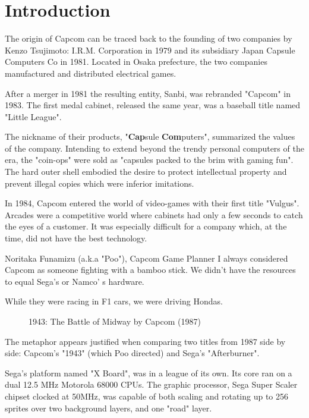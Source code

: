 \chapter{Introduction} 

The origin of Capcom can be traced back to the founding of two companies by Kenzo Tsujimoto: I.R.M. Corporation in 1979 and its subsidiary Japan Capsule Computers Co in 1981. Located in Osaka prefecture, the two companies manufactured and distributed electrical games.

After a merger in 1981 the resulting entity, Sanbi, was rebranded "Capcom" in 1983. The first medal cabinet, released the same year, was a baseball title named "Little League".

The nickname of their products, "\textbf{Cap}sule \textbf{Com}puters", summarized the values of the company. Intending to extend beyond the trendy personal computers of the era, the "coin-ops" were sold as "capsules packed to the brim with gaming fun". The hard outer shell embodied the desire to protect intellectual property and prevent illegal copies which were inferior imitations.


 In 1984, Capcom entered the world of video-games with their first title "Vulgus".
Arcades were a competitive world where cabinets had only a few seconds to catch the eyes of a customer. It was especially difficult for a company which, at the time, did not have the best technology.

\begin{q}{Noritaka Funamizu (a.k.a "Poo"), Capcom Game Planner\cite{planner}}
I always considered Capcom as someone fighting with a bamboo stick. We didn't have the resources to equal Sega's or Namco'
s hardware. 

While they were racing in F1 cars, we were driving Hondas.
\end{q}


\begin{figure}[H]
\caption*{1943: The Battle of Midway by Capcom (1987)}
\end{figure}

The metaphor appears justified when comparing two titles from 1987 side by side: Capcom's "1943" (which Poo directed) and Sega's "Afterburner".

Sega's platform named "X Board", was in a league of its own. Its core ran on a dual 12.5 MHz Motorola 68000 CPUs. The graphic processor, Sega Super Scaler chipset clocked at 50MHz, was capable of both scaling and rotating up to 256 sprites over two background layers, and one "road" layer. 

